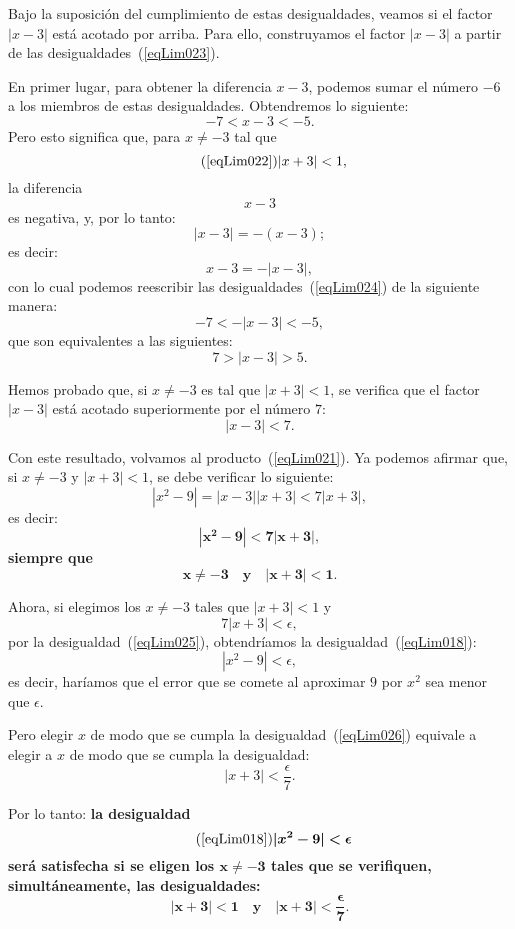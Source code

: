 \begin{exemplo}[Solución]
Bajo la suposición del cumplimiento de estas desigualdades, veamos si el factor $|x-3|$ está
acotado por arriba. Para ello, construyamos el factor $|x - 3|$ a partir de las
desigualdades~(\ref{eqLim023}).

En primer lugar, para obtener la diferencia $x - 3$, podemos sumar el número $-6$ a los miembros de
estas desigualdades. Obtendremos lo siguiente:
\begin{equation}
\label{eqLim024}
-7 < x - 3 < -5.
\end{equation}
Pero esto significa que, para $x \neq -3$ tal que
\[
\tag{\ref{eqLim022}}
|x + 3| < 1,
\]
la diferencia
\[
x - 3
\]
es negativa, y, por lo tanto:
\[
|x - 3| = -(x - 3);
\]
es decir:
\[
x - 3 = -|x - 3|,
\]
con lo cual podemos reescribir las desigualdades~(\ref{eqLim024}) de la siguiente manera:
\[
-7 < -|x - 3| < -5,
\]
que son equivalentes a las siguientes:
\[
7 > |x - 3| > 5.
\]

Hemos probado que, si $x\neq -3$ es tal que $|x + 3| < 1$, se verifica que el factor $|x - 3|$ está
acotado superiormente por el número $7$:
\[
|x - 3| < 7.
\]

Con este resultado, volvamos al producto~(\ref{eqLim021}). Ya podemos afirmar que, si $x\neq -3$ y
$|x + 3| < 1$, se debe verificar lo siguiente:
\[
|x^2 - 9| = |x - 3||x+3| < 7|x + 3|,
\]
es decir:{\bfseries
\begin{equation}
\label{eqLim025}
\bm{|x^2 - 9| < 7|x + 3|,}
\end{equation}
siempre que
\[
\bm{x\neq -3 \quad\text{y}\quad |x + 3| < 1}.
\]}

Ahora, si elegimos los $x\neq -3$ tales que $|x + 3| < 1$ y
\begin{equation}
\label{eqLim026}
7|x + 3| < \epsilon,
\end{equation}
por la desigualdad~(\ref{eqLim025}), obtendríamos la desigualdad~(\ref{eqLim018}):
\[
|x^2 - 9| < \epsilon,
\]
es decir, haríamos que el error que se comete al aproximar $9$ por $x^2$ sea menor que $\epsilon$.

Pero elegir $x$ de modo que se cumpla la desigualdad~(\ref{eqLim026}) equivale a elegir a $x$ de
modo que se cumpla la desigualdad:
\begin{equation}
\label{eqLim027}
|x + 3| < \frac{\epsilon}{7}.
\end{equation}

Por lo tanto: {\bfseries la desigualdad
\[
\tag{\ref{eqLim018}}
\bm{|x^2 - 9| < \epsilon}
\]
será satisfecha si se eligen los $\bm{x\neq -3}$ tales que se verifiquen, simultáneamente, las
desigualdades:
\[
\bm{|x + 3| < 1 \quad\text{y}\quad |x + 3| < \frac{\epsilon}{7}}.
\]
}


\end{exemplo}
